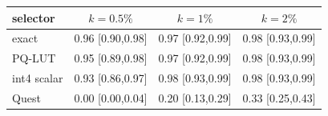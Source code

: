 \begin{tabular}{l c c c}
\toprule
selector & $k{=}0.5\%$ & $k{=}1\%$ & $k{=}2\%$ \\
\midrule
exact & 0.96 [0.90,0.98] & 0.97 [0.92,0.99] & 0.98 [0.93,0.99] \\
PQ-LUT & 0.95 [0.89,0.98] & 0.97 [0.92,0.99] & 0.98 [0.93,0.99] \\
int4 scalar & 0.93 [0.86,0.97] & 0.98 [0.93,0.99] & 0.98 [0.93,0.99] \\
Quest & 0.00 [0.00,0.04] & 0.20 [0.13,0.29] & 0.33 [0.25,0.43] \\
\bottomrule
\end{tabular}
